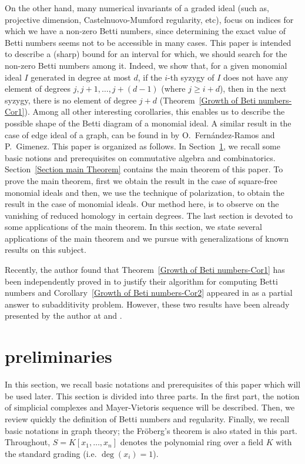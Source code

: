 \documentclass[a4paper,11pt]{amsart}
\theoremstyle{plain}
\theoremstyle{definition}
\theoremstyle{remark}
\begin{document}
On the other hand, many numerical invariants of a graded ideal (such as, projective dimension, Castelnuovo-Mumford regularity, etc), focus on indices for which we have a non-zero Betti numbers, since determining the exact value of Betti numbers seems not to be accessible in many cases. This paper is intended to describe a (sharp) bound for an interval for which, we should search for the non-zero Betti numbers among it. Indeed, we show that, for a given monomial ideal $I$ generated in degree at most $d$, if the $i$-th syzygy of $I$ does not have any element of degrees $j, j+1, \ldots, j+(d-1)$ (where $j \geq i+d$), then in the next syzygy, there is no element of degree $j+d$ (Theorem~\ref{Growth of Beti numbers-Cor1}). Among all other interesting corollaries, this enables us to describe the possible shape of the Betti diagram of a monomial ideal. A similar result in the case of edge ideal of a graph, can be found in \cite{Oscar} by O.~Fern{\'a}ndez-Ramos and P.~Gimenez. This paper is organized as follows. In Section~\ref{Preliminaries}, we recall some basic notions and prerequisites on commutative algebra and combinatorics. Section~\ref{Section main Theorem} contains the main theorem of this paper. To prove the main theorem, first we obtain the result in the case of square-free monomial ideals and then, we use the technique of polarization, to obtain the result in the case of monomial ideals. Our method here, is to observe on the vanishing of reduced homology in certain degrees. The last section is devoted to some applications of the main theorem. In this section, we state several applications of the main theorem and we pursue with generalizations of known results on this subject.

Recently, the author found that Theorem~\ref{Growth of Beti numbers-Cor1} has been independently proved in \cite{Varbaro} to justify their algorithm for computing Betti numbers and Corollary~\ref{Growth of Beti numbers-Cor2} appeared in \cite{Herzog-Srinivasan} as a partial answer to subadditivity problem. However, these two results have been already presented by the author at \cite[in 2012]{Y12} and \cite[in 2014]{Y14}.

\section{preliminaries} \label{Preliminaries}
In this section, we recall basic notations and prerequisites of this paper which will be used later. This section is divided into three parts. In the first part, the notion of simplicial complexes and Mayer-Vietoris sequence will be described. Then, we review quickly the definition of Betti numbers and regularity. Finally, we recall basic notations in graph theory; the Fr\"oberg's theorem is also stated in this part. Throughout, $S=K[x_1, \ldots, x_n]$ denotes the polynomial ring over a field $K$ with the standard grading (i.e. $\deg(x_i)=1$).
\end{document}

